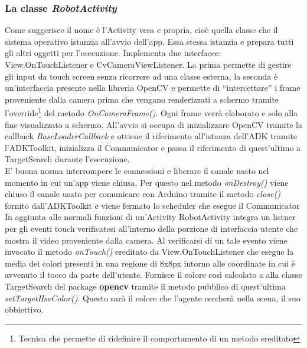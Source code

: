 \subsubsection{La classe \emph{RobotActivity}}
Come suggerisce il nome è l'Activity vera e propria, cioè quella classe che il 
sistema operativo istanzia all'avvio dell'app. Essa stessa istanzia e prepara tutti gli 
altri oggetti per l'esecuzione. Implementa due interfacce: View.OnTouchListener 
e CvCameraViewListener. 
La prima permette di gestire gli input da touch screen senza ricorrere ad una classe esterna,
la seconda è un'interfaccia presente nella libreria OpenCV e permette di ``intercettare''
i frame proveniente dalla camera prima che vengano renderizzati a schermo tramite 
l'override\footnote{Tecnica che permette di ridefinire il comportamento di un metodo 
ereditato} del metodo \textit{OnCameraFrame()}. Ogni frame verrà elaborato e solo alla
fine visualizzato a schermo.
All'avvio si occupa di inizializzare OpenCV tramite la 
callback \textit{BaseLoaderCallback} e ottiene il riferimento all'istanza dell'ADK
tramite l'ADKToolkit, inizializza il Communicator e passa il riferimento di quest'ultimo
 a TargetSearch durante l'esecuzione.\\E' buona norma interrompere le connessioni e liberare il canale usato 
nel momento in cui un'app viene chiusa. Per questo nel metodo \emph{onDestroy()} 
viene chiuso il canale usato per comunicare con Arduino tramite il metodo \emph{close()}
fornito dall'ADKToolkit e viene fermato lo scheduler che esegue il Communicator\\
In aggiunta alle normali funzioni di un'Activity RobotActivity integra un 
listner per gli eventi touch verificatesi all'interno della porzione di 
interfaccia utente che mostra il video proveniente dalla camera. Al verificarsi di un
tale evento viene invocato il metodo \emph{onTouch()} ereditato da View.OnTouchListener 
che esegue la media dei colori presenti in una regione di 8x8px intorno alle coordinate
in cui è avvenuto il tocco da parte dell'utente. Fornisce il colore così calcolato a 
alla classe TargetSearch del package \textbf{opencv} tramite il metodo pubblico 
di quest'ultima \emph{setTargetHsvColor()}. Questo sarà il colore che l'agente cercherà
nella scena, il suo obbiettivo.

